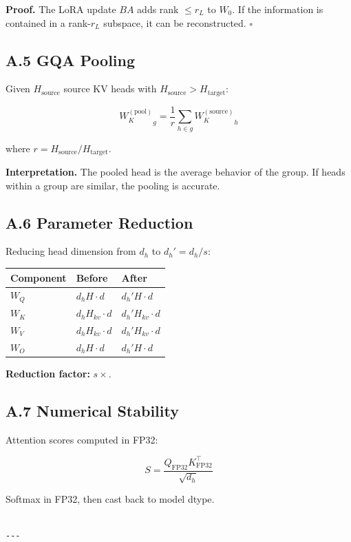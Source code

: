 \textbf{Proof.} The LoRA update $B A$ adds rank $\leq r_L$ to $W_0$. If the 
information is contained in a rank-$r_L$ subspace, it can be reconstructed. 
$\square$

\subsection{A.5 GQA Pooling}

Given $H_\text{source}$ source KV heads with $H_\text{source} > H_\text{target}$:

\[
{W_K^{(\text{pool})}}_g = \frac{1}{r} \sum_{h \in g} {W_K^{(\text{source})}}_h
\]

where $r = H_\text{source} / H_\text{target}$.

\textbf{Interpretation.} The pooled head is the average behavior of the group. 
If heads within a group are similar, the pooling is accurate.

\subsection{A.6 Parameter Reduction}

Reducing head dimension from $d_h$ to $d_h' = d_h / s$:

\begin{table}[H]
\centering
\small
\begin{tabular}{lll}
\toprule
\textbf{Component} & \textbf{Before} & \textbf{After} \\
\midrule
$W_Q$ & $d_h H \cdot d$ & $d_h' H \cdot d$ \\
$W_K$ & $d_h H_{kv} \cdot d$ & $d_h' H_{kv} \cdot d$ \\
$W_V$ & $d_h H_{kv} \cdot d$ & $d_h' H_{kv} \cdot d$ \\
$W_O$ & $d_h H \cdot d$ & $d_h' H \cdot d$ \\
\bottomrule
\end{tabular}
\end{table}

\textbf{Reduction factor:} $s\times$.

\subsection{A.7 Numerical Stability}

Attention scores computed in FP32:

\[
S = \frac{Q_\text{FP32} K_\text{FP32}^\top}{\sqrt{d_h}}
\]

Softmax in FP32, then cast back to model dtype.
\begin{lstlisting}

---
\end{lstlisting}